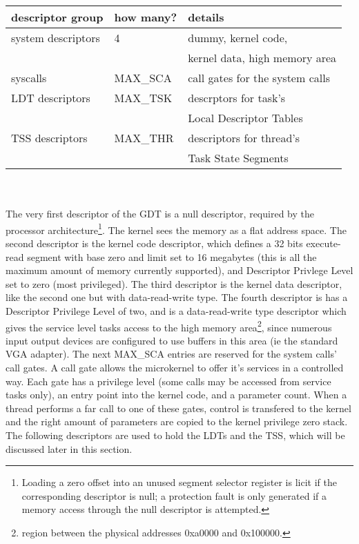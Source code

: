 \documentclass[11pt, letterpaper, twoside, english]{book}
\begin{document}
\begin{tabular}{|l|l|l|}
\hline
\textbf{descriptor group} & \textbf{how many?} & \textbf{details} \\
\hline
system descriptors & 4 & dummy, kernel code, \\
 & & kernel data, high memory area \\
\hline
syscalls & \textsf{MAX\_SCA} & call gates for the system calls \\
\hline
LDT descriptors & \textsf{MAX\_TSK} & descrptors for task's \\
 & & Local Descriptor Tables \\
\hline
TSS descriptors & \textsf{MAX\_THR} & descriptors for thread's \\
 & & Task State Segments \\
\hline 
\end{tabular}
\\
\\

The very first descriptor of the GDT is a null descriptor, required by the processor architecture\footnote{Loading a zero offset into an unused segment selector register is licit if the corresponding descriptor is null; a protection fault is only generated if a memory access through the null descriptor is attempted.}. The kernel sees the memory as a flat address space. The second descriptor is the kernel code descriptor, which defines a 32 bits execute-read segment with base zero and limit set to 16 megabytes (this is all the maximum amount of memory currently supported), and Descriptor Privlege Level set to zero (most privileged). The third descriptor is the kernel data descriptor, like the second one but with data-read-write type. The fourth descriptor is has a Descriptor Privilege Level of two, and is a data-read-write type descriptor which gives the service level tasks access to the high memory area\footnote{region between the physical addresses 0xa0000 and 0x100000.}, since numerous input output devices are configured to use buffers in this area (ie the standard VGA adapter). The next \textsf{MAX\_SCA} entries are reserved for the system calls' call gates. A call gate allows the microkernel to offer it's services in a controlled way. Each gate has a privilege level (some calls may be accessed from service tasks only), an entry point into the kernel code, and a parameter count. When a thread performs a far call to one of these gates, control is transfered to the kernel and the right amount of parameters are copied to the kernel privilege zero stack. The following descriptors are used to hold the LDTs and the TSS, which will be discussed later in this section. 
\end{document}
